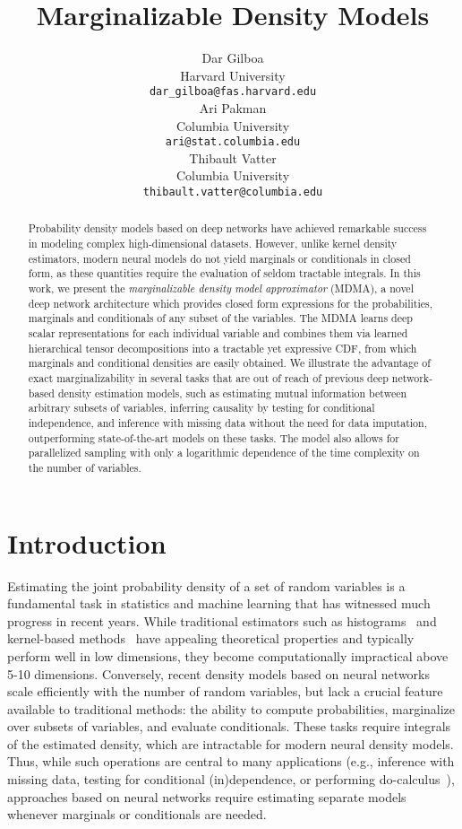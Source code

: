 \documentclass{article}
\title{Marginalizable Density Models}
\author{
   Dar Gilboa \\
   Harvard University \\
   \texttt{dar\_gilboa@fas.harvard.edu} \\
   \And
   Ari Pakman \\
   Columbia University \\
   \texttt{ari@stat.columbia.edu} \\
   \And
   Thibault Vatter \\
   Columbia University \\
   \texttt{thibault.vatter@columbia.edu} \\
}
\begin{document}
\maketitle
\begin{abstract}
Probability density models based on deep networks have achieved
remarkable success in modeling complex high-dimensional datasets.
However, unlike kernel density estimators, modern neural models do not yield marginals or conditionals in closed form, 
as these quantities require the evaluation of seldom tractable integrals.
In this work, we present the \emph{marginalizable density model approximator} (MDMA),
a novel deep network architecture which provides closed form expressions for the probabilities, marginals and conditionals of any subset of the variables.
The MDMA learns deep
scalar representations for each individual variable
and combines them via learned hierarchical tensor decompositions into a tractable yet expressive CDF,
from which marginals and conditional densities are easily obtained.
We illustrate the advantage of exact marginalizability in several tasks that are out of reach of previous deep network-based density estimation models, such as estimating mutual information between arbitrary subsets of variables, inferring causality by testing for conditional independence, and inference with missing data without the need for data imputation, outperforming state-of-the-art models on these tasks. The model also allows for parallelized sampling with only a logarithmic dependence of the time complexity on the number of variables.  
\end{abstract}




\section{Introduction}\label{sec:intro}

Estimating the joint probability density of a set of random variables is a fundamental task in statistics and machine learning that has witnessed much progress in recent years.
While traditional estimators such as histograms~\cite{scott1979optimal,lugosi1996consistency} and kernel-based methods~\cite{Rosenblatt,parzen1962estimation} have appealing theoretical properties and typically perform well in low dimensions, they become computationally impractical above 5-10 dimensions.
Conversely, recent density models based on neural networks~\cite{kingma2018,huang2018neural,oliva2018transformation,grathwohl2018ffjord,de2020block,bigdeli2020learning} scale efficiently with the number of random variables, but lack a crucial feature available to traditional methods: the ability to compute probabilities, marginalize over subsets of variables, and evaluate conditionals. These tasks require integrals of the estimated density, 
which are intractable for modern neural density models.  
Thus, while such operations are central 
to many applications (e.g., inference with missing data, testing for conditional (in)dependence, or performing do-calculus~\cite{pearl_book}), approaches based on neural networks require estimating separate models 
whenever marginals or conditionals are needed.  
\end{document}
